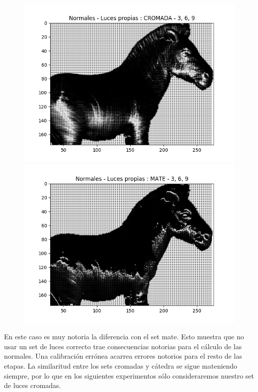 \begin{figure}[H]
\centering
\begin{minipage}{.5\textwidth}
  \centering
  \includegraphics[width=1\linewidth]{informe/imagenes/normales/normalesLucesPropias369.png}
\end{minipage}%
\begin{minipage}{.5\textwidth}
  \centering
  \includegraphics[width=1\linewidth]{informe/imagenes/normales/normalesLucesPropiasMate369.png}
\end{minipage}
\end{figure}

En este caso es muy notoria la diferencia con el set mate. Esto muestra que no usar un set de luces correcto trae consecuencias notorias para el cálculo de las normales. Una calibración errónea acarrea errores notorios para el resto de las etapas. La similaritud entre los sets cromadas y cátedra se sigue mateniendo siempre, por lo que en los siguientes experimentos sólo consideraremos nuestro set de luces cromadas. \\

